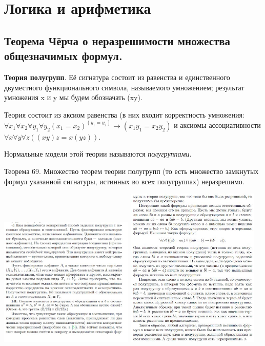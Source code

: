 \setcounter{section}{0}
\section{Логика и арифметика}

\subsection{Теорема Чёрча о неразрешимости множества общезначимых формул.}

\textbf{Теория полугрупп}. Её сигнатура состоит из равенства и единственного двуместного функционального символа, называемого умножением; результат умножения x и y мы будем
обозначать (xy). 

Теория состоит из аксиом равенства (в них входит корректность
умножения: $\forall x_1 \forall x_2 \forall y_1 \forall y_2 (x_1 = x_2) ^ (y_1 = y_2) \rightarrow (x_1y_1 = x_2y_2)$ и аксиомы ассоциативности $\forall x \forall y \forall z ((xy)z = x(yz))$.

Нормальные модели этой теории называются \emph{полугруппами}.

Теорема 69. Множество теорем теории полугрупп (то есть множество замкнутых формул указанной сигнатуры, истинных во всеx полугруппах) неразрешимо.

\begin{center}
    \includegraphics[width=0.48\textwidth]{images/1.1_church1}
    \includegraphics[width=0.48\textwidth]{images/1.1_church2}
\end{center}

